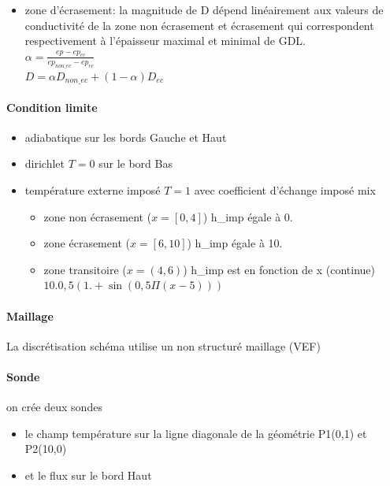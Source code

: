 \documentclass{article}
\begin{document}
\begin{itemize}
		\item zone d'écrasement: la magnitude de D dépend linéairement aux valeurs de conductivité de la zone non écrasement et écrasement qui correspondent respectivement à l'épaisseur maximal et minimal de GDL. \\
		$ \alpha = \frac{ep-ep_{ec}}{ep_{non\_ec}-ep_{ec}} $ \\
		
		$ D = \alpha D_{non\_ec}+(1-\alpha) D_{ec} $ \\
	\end{itemize}
	
	\paragraph{Condition limite}
	\begin{itemize}
		\item adiabatique sur les bords Gauche et Haut \\
		\item dirichlet $ T = 0 $ sur le bord Bas \\
		\item température externe imposé $ T = 1 $ avec coefficient d'échange imposé mix \\
		\begin{itemize}
			\item zone non écrasement ($ x = [0, 4] $) h\_imp égale à 0. \\
			\item zone écrasement ($x = [6, 10]$) h\_imp égale à 10. \\
			\item zone transitoire ($x = (4, 6)$) h\_imp est en fonction de x (continue)
			 $ 10.0,5(1.+ \sin(0,5\Pi(x-5))) $ \\
		\end{itemize}
	\end{itemize} \par

	\paragraph{Maillage}
	La discrétisation schéma utilise un non structuré maillage (VEF) \par
	
	\paragraph{Sonde}
	on crée deux sondes
	\begin{itemize}
		\item  le champ température sur la ligne diagonale de la géométrie P1(0,1) et P2(10,0)
		\item et le flux sur le bord Haut
	\end{itemize}
	
\end{document}
